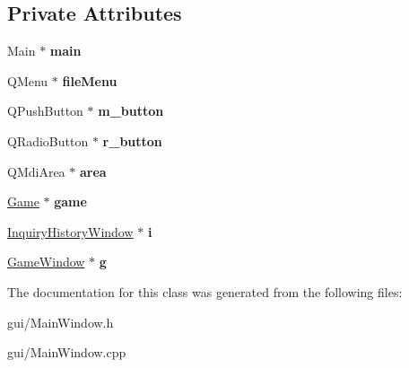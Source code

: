 \subsection*{Private Attributes}
\begin{DoxyCompactItemize}
\item 
\mbox{\label{classMainWindow_af3be7105ec7a07f29d5cd754505fa379}} 
Main $\ast$ {\bfseries main}
\item 
\mbox{\label{classMainWindow_a426da48f6e2f865b07a28533c07c4f7a}} 
Q\+Menu $\ast$ {\bfseries file\+Menu}
\item 
\mbox{\label{classMainWindow_ab8b66780eeee5d72866f9b06d11c90c5}} 
Q\+Push\+Button $\ast$ {\bfseries m\+\_\+button}
\item 
\mbox{\label{classMainWindow_a32525095d73c56e8342b47678d3afe7d}} 
Q\+Radio\+Button $\ast$ {\bfseries r\+\_\+button}
\item 
\mbox{\label{classMainWindow_a6e6f045d7a365dbf417c1f4bd5820ed0}} 
Q\+Mdi\+Area $\ast$ {\bfseries area}
\item 
\mbox{\label{classMainWindow_a568937c16f40d1f913552a824d8c1eb9}} 
\hyperlink{classGame}{Game} $\ast$ {\bfseries game}
\item 
\mbox{\label{classMainWindow_a29195760ac1f63f657eea6af713182a3}} 
\hyperlink{classInquiryHistoryWindow}{Inquiry\+History\+Window} $\ast$ {\bfseries i}
\item 
\mbox{\label{classMainWindow_a509d355bc020d8b38e02843c0674a45f}} 
\hyperlink{classGameWindow}{Game\+Window} $\ast$ {\bfseries g}
\end{DoxyCompactItemize}


The documentation for this class was generated from the following files\+:\begin{DoxyCompactItemize}
\item 
gui/Main\+Window.\+h\item 
gui/Main\+Window.\+cpp\end{DoxyCompactItemize}
